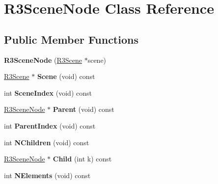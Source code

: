 \hypertarget{class_r3_scene_node}{}\section{R3\+Scene\+Node Class Reference}
\label{class_r3_scene_node}
\subsection*{Public Member Functions}
\begin{DoxyCompactItemize}
\item 
{\bfseries R3\+Scene\+Node} (\hyperlink{class_r3_scene}{R3\+Scene} $\ast$scene)\hypertarget{class_r3_scene_node_a41537f2a0542a5a256dd524690fe6d17}{}\label{class_r3_scene_node_a41537f2a0542a5a256dd524690fe6d17}

\item 
\hyperlink{class_r3_scene}{R3\+Scene} $\ast$ {\bfseries Scene} (void) const \hypertarget{class_r3_scene_node_a6449396f57597b2528a644c4bab5eb56}{}\label{class_r3_scene_node_a6449396f57597b2528a644c4bab5eb56}

\item 
int {\bfseries Scene\+Index} (void) const \hypertarget{class_r3_scene_node_a2e87b753e2113a37df4ef07a71d20fd0}{}\label{class_r3_scene_node_a2e87b753e2113a37df4ef07a71d20fd0}

\item 
\hyperlink{class_r3_scene_node}{R3\+Scene\+Node} $\ast$ {\bfseries Parent} (void) const \hypertarget{class_r3_scene_node_a15105880ea244b37a3f5b2eeca434533}{}\label{class_r3_scene_node_a15105880ea244b37a3f5b2eeca434533}

\item 
int {\bfseries Parent\+Index} (void) const \hypertarget{class_r3_scene_node_acbe60d1b8a3f463e2aebb3d9c0a2f062}{}\label{class_r3_scene_node_acbe60d1b8a3f463e2aebb3d9c0a2f062}

\item 
int {\bfseries N\+Children} (void) const \hypertarget{class_r3_scene_node_a1e07123fb83052c0b4b16ae39f627edd}{}\label{class_r3_scene_node_a1e07123fb83052c0b4b16ae39f627edd}

\item 
\hyperlink{class_r3_scene_node}{R3\+Scene\+Node} $\ast$ {\bfseries Child} (int k) const \hypertarget{class_r3_scene_node_a6ae48d67d0211bab6e9fc1debd2fc3a3}{}\label{class_r3_scene_node_a6ae48d67d0211bab6e9fc1debd2fc3a3}

\item 
int {\bfseries N\+Elements} (void) const \hypertarget{class_r3_scene_node_a825ec6000cbc469b20623315ed603084}{}\label{class_r3_scene_node_a825ec6000cbc469b20623315ed603084}


\end{DoxyCompactItemize}
